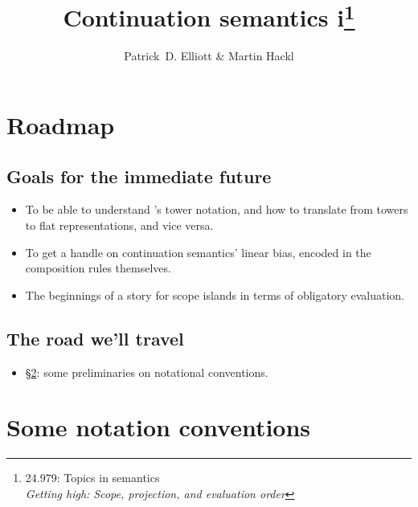 \documentclass[nols,twoside,nofonts,nobib,nohyper]{tufte-handout}
\title{Continuation semantics i\thanks{24.979: Topics in
    semantics\\\noindent\textit{Getting high: Scope, projection, and evaluation order}}}
\author[Patrick D. Elliott and Martin Hackl]{Patrick~D. Elliott\sidenote{\texttt{pdell@mit.edu}} \& Martin Hackl\sidenote{\texttt{hackl@mit.edu}}}
\begin{document}
\maketitle%


\section{Roadmap}

\subsection{Goals for the immediate future}

\begin{itemize}

    \item To be able to understand \citeauthor{barkerShan2015}'s tower notation,
    and how to translate from towers to flat representations, and vice versa.

    \item To get a handle on continuation semantics' linear bias, encoded in the
    composition rules themselves.

    \item The beginnings of a story for scope islands in terms of obligatory evaluation.

\end{itemize}

\subsection{The road we'll travel}

\begin{itemize}

    \item \S\ref{sec:notation}: some preliminaries on notational conventions.


\end{itemize}


\section{Some notation conventions}\label{sec:notation}
\end{document}
